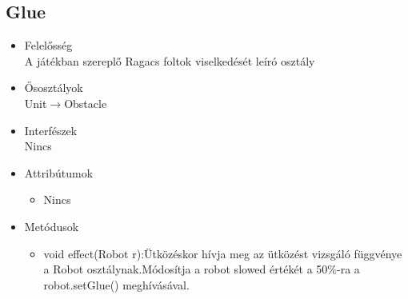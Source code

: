 \subsection{Glue}
\begin{itemize}
\item Felelősség\\
A játékban szereplő Ragacs foltok viselkedését leíró osztály
\item Ősosztályok\\
Unit$\rightarrow$Obstacle
\item Interfészek\\
Nincs
\item Attribútumok\\
	\begin{itemize}
	   \item  Nincs
\end{itemize}
\item Metódusok\\
	\begin{itemize}
		\item void effect(Robot r):Ütközéskor hívja meg az ütközést vizsgáló függvénye a Robot osztálynak.Módosítja a robot slowed értékét a 50\%-ra a robot.setGlue() meghívásával.
	\end{itemize}
\end{itemize}

